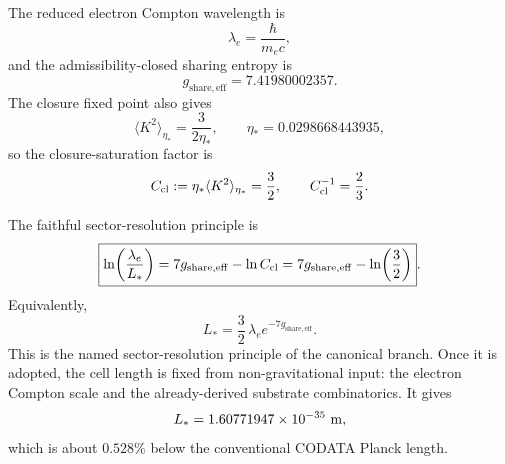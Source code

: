 \documentclass[11pt]{article}
\begin{document}
The reduced electron Compton wavelength is
\[
\lambda_e=\frac{\hbar}{m_ec},
\]
and the admissibility-closed sharing entropy is
\[
g_{\mathrm{share,eff}}=7.41980002357.
\]
The closure fixed point also gives
\[
\langle K^2\rangle_{\eta_*}=\frac{3}{2\eta_*},
\qquad
\eta_*=0.0298668443935,
\]
so the closure-saturation factor is
\[
C_{\rm cl}:=\eta_*\langle K^2\rangle_{\eta_*}=\frac32,
\qquad
C_{\rm cl}^{-1}=\frac23.
\]

The faithful sector-resolution principle is
\[
\boxed{
\ln\!\left(\frac{\lambda_e}{L_*}\right)
=
7g_{\mathrm{share,eff}}-\ln C_{\rm cl}
=
7g_{\mathrm{share,eff}}-\ln\!\left(\frac32\right)
}.
\]
Equivalently,
\[
\boxed{
L_*=\frac32\,\lambda_e e^{-7g_{\mathrm{share,eff}}}
}.
\]
This is the named sector-resolution principle of the canonical branch. Once it is adopted, the cell length is fixed from non-gravitational input: the electron Compton scale and the already-derived substrate combinatorics. It gives
\[
L_*=1.60771947\times10^{-35}\ {\rm m},
\]
which is about $0.528\%$ below the conventional CODATA Planck length.
\end{document}
